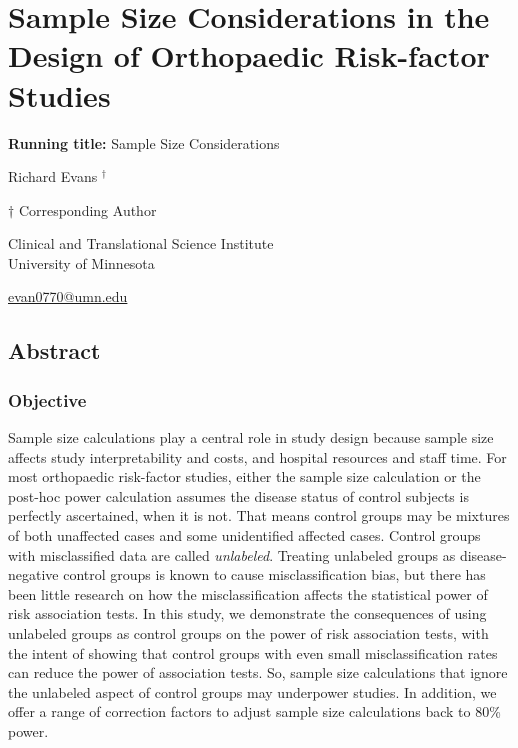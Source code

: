 \documentclass[
]{article}
\author{}
\date{\vspace{-2.5em}}
\begin{document}
\hypertarget{sample-size-considerations-in-the-design-of-orthopaedic-risk-factor-studies}{%
\section{Sample Size Considerations in the Design of Orthopaedic
Risk-factor
Studies}\label{sample-size-considerations-in-the-design-of-orthopaedic-risk-factor-studies}}

\textbf{Running title:} Sample Size Considerations

Richard Evans \({^\dagger}\)

\({\dagger}\) Corresponding Author

Clinical and Translational Science Institute\\
University of Minnesota

\href{mailto:evan0770@umn.edu}{evan0770@umn.edu}

\newpage

\hypertarget{abstract}{%
\subsection{Abstract}\label{abstract}}

\hypertarget{objective}{%
\subsubsection{Objective}\label{objective}}

Sample size calculations play a central role in study design because
sample size affects study interpretability and costs, and hospital
resources and staff time. For most orthopaedic risk-factor studies,
either the sample size calculation or the post-hoc power calculation
assumes the disease status of control subjects is perfectly ascertained,
when it is not. That means control groups may be mixtures of both
unaffected cases and some unidentified affected cases. Control groups
with misclassified data are called \emph{unlabeled}. Treating unlabeled
groups as disease-negative control groups is known to cause
misclassification bias, but there has been little research on how the
misclassification affects the statistical power of risk association
tests. In this study, we demonstrate the consequences of using unlabeled
groups as control groups on the power of risk association tests, with
the intent of showing that control groups with even small
misclassification rates can reduce the power of association tests. So,
sample size calculations that ignore the unlabeled aspect of control
groups may underpower studies. In addition, we offer a range of
correction factors to adjust sample size calculations back to 80\%
power.
\end{document}
